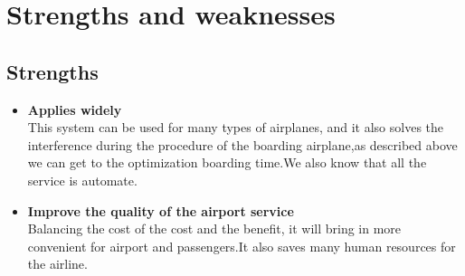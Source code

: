 \documentclass[../mcmpaper]{subfiles}
\begin{document}
	\section{Strengths and weaknesses}
	\lipsum[12]
	\subsection{Strengths}
	\begin{itemize}
		\item \textbf{Applies widely}\\
		This  system can be used for many types of airplanes, and it also
		solves the interference during  the procedure of the boarding
		airplane,as described above we can get to the  optimization
		boarding time.We also know that all the service is automate.
		\item \textbf{Improve the quality of the airport service}\\
		Balancing the cost of the cost and the benefit, it will bring in
		more convenient  for airport and passengers.It also saves many
		human resources for the airline.
	\end{itemize}
\end{document}
